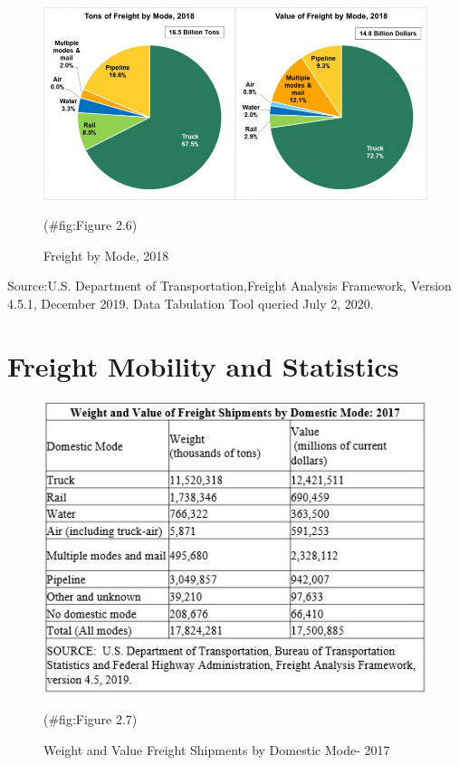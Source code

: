 \documentclass[
]{book}
\begin{document}
\begin{figure}

{\centering \includegraphics{./Images/Intro/Freight by Mode, 2018} 

}

\caption{Freight by Mode, 2018}(\#fig:Figure 2.6)
\end{figure}

Source:U.S. Department of Transportation,Freight Analysis Framework, Version 4.5.1, December 2019. Data Tabulation Tool queried July 2, 2020.

\hypertarget{intro-Freight_mobility}{%
\section{Freight Mobility and Statistics}\label{intro-Freight_mobility}}

\begin{figure}

{\centering \includegraphics{./Images/Intro/Weight and Value Freight Shipments by Domestic Mode- 2017} 

}

\caption{Weight and Value Freight Shipments by Domestic Mode- 2017}(\#fig:Figure 2.7)
\end{figure}
\end{document}
